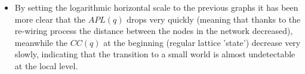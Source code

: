 \documentclass{article}
\begin{document}
\begin{itemize}
        \item By setting the logarithmic horizontal scale to the previous graphs it has been more clear that the \(APL(q)\) drops very quickly (meaning that thanks to the re-wiring process the distance between the nodes in the network decreased), meanwhile the \(CC(q)\) at the beginning (regular lattice 'state') decrease very slowly, indicating that the transition to a small world is almost undetectable at the local level.

    \end{itemize}
\end{document}
